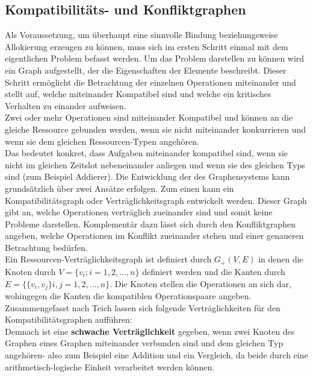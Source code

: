 \documentclass[conference]{IEEEtran}
\begin{document}
\subsection{Kompatibilitäts- und Konfliktgraphen}
Als Voraussetzung, um überhaupt eine sinnvolle Bindung beziehungsweise Allokierung erzeugen zu können, muss sich im ersten Schritt einmal mit dem eigentlichen Problem befasst werden. Um das Problem darstellen zu können wird ein Graph aufgestellt, der die Eigenschaften der Elemente beschreibt. Dieser Schritt ermöglicht die Betrachtung der einzelnen Operationen miteinander und stellt auf, welche miteinander Kompatibel sind und welche ein kritisches Verhalten zu einander aufweisen.\\
Zwei oder mehr Operationen sind miteinander Kompatibel und können an die gleiche Ressource gebunden werden, wenn sie nicht miteinander konkurrieren und wenn sie dem gleichen Ressourcen-Typen angehören.\cite[S.231]{3}\\
Das bedeutet konkret, dass Aufgaben miteinander kompatibel sind, wenn sie nicht im gleichen Zeitslot nebeneinander anliegen und wenn sie des gleichen Typs sind (zum Beispiel Addierer).
Die Entwicklung der des Graphensystems kann grundsätzlich über zwei Ansätze erfolgen. Zum einen kann ein Kompatibilitätsgraph oder Verträglichkeitsgraph entwickelt werden. Dieser Graph gibt an, welche Operationen verträglich zueinander sind und somit keine Probleme darstellen. Komplementär dazu lässt sich durch den Konfliktgraphen angeben, welche Operationen im Konflikt zueinander stehen und einer genaueren Betrachtung bedürfen.\\
Ein Ressourcen-Verträglichkeitsgraph ist definiert durch $ G_+(V,E)$ in denen die Knoten durch $ V = \{v_i;i=1,2,...,n\}$ definiert werden und die Kanten durch $E = \{\{v_i,v_j\}i,j = 1,2,...,n\}$. Die Knoten stellen die Operationen an sich dar, wohingegen die Kanten die kompatiblen Operationspaare angeben\cite[S.231]{3}.\\
Zusammengefasst nach  Teich \cite[S. 181-182]{1} lassen sich folgende Verträglichkeiten für den Kompatibilitätsgraphen aufführen:\\

Demnach ist eine \textbf{schwache Verträglichkeit} gegeben, wenn zwei Knoten des Graphen
eines Graphen miteinander verbunden sind und dem gleichen Typ angehören- also zum Beispiel eine Addition und ein Vergleich, da beide durch eine arithmetisch-logische Einheit verarbeitet werden können.\cite{?}\\
\end{document}
